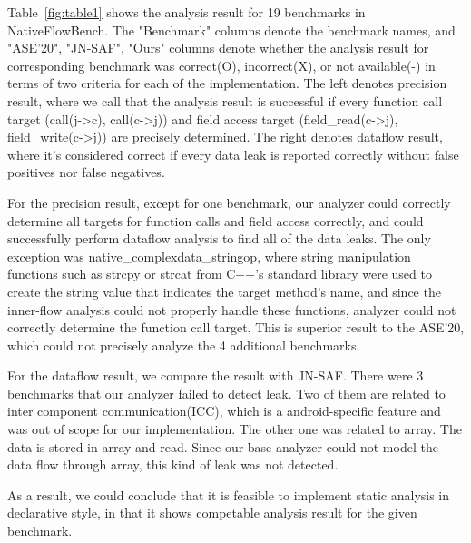 Table~\ref{fig:table1} shows the analysis result for 19 benchmarks in NativeFlowBench.  The
"Benchmark" columns denote the benchmark names, and "ASE'20", "JN-SAF", "Ours"
columns denote whether the analysis result for corresponding benchmark was
correct(O), incorrect(X), or not available(-) in terms of two criteria for each
of the implementation.  The left denotes precision result, where we call that
the analysis result is successful if every function call target (call(j->c),
call(c->j)) and field access target (field\_read(c->j), field\_write(c->j)) are
precisely determined. The right denotes dataflow result, where it's considered
correct if every data leak is reported correctly without false positives nor
false negatives. 

For the precision result, except for one benchmark, our analyzer could
correctly determine all targets for function calls and field access correctly,
and could successfully perform dataflow analysis to find all of the data leaks.
The only exception was native\_complexdata\_stringop, where string manipulation
functions such as strcpy or strcat from C++'s standard library were used to
create the string value that indicates the target method's name, and since the
inner-flow analysis could not properly handle these functions, analyzer could
not correctly determine the function call target. This is superior result to
the ASE'20, which could not precisely analyze the 4 additional benchmarks.

For the dataflow result, we compare the result with JN-SAF. There were 3 benchmarks
that our analyzer failed to detect leak. Two of them are related to inter component
communication(ICC), which is a android-specific feature and was out of scope for
our implementation. The other one was related to array. The data is stored in
array and read. Since our base analyzer could not model the data flow through
array, this kind of leak was not detected.

As a result, we could conclude that it is feasible to implement
static analysis in declarative style, in that it shows competable
analysis result for the given benchmark.


